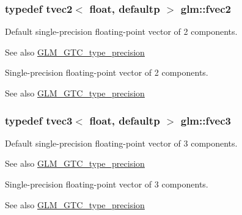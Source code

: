 \subsubsection[{fvec2}]{\setlength{\rightskip}{0pt plus 5cm}typedef tvec2$<$ float, defaultp $>$ {\bf glm\+::fvec2}}\label{group__gtc__type__precision_ga83fb34639f810d0c9240cf7ff0180e20}
Default single-\/precision floating-\/point vector of 2 components. \begin{DoxySeeAlso}{See also}
\hyperlink{group__gtc__type__precision}{G\+L\+M\+\_\+\+G\+T\+C\+\_\+type\+\_\+precision}
\end{DoxySeeAlso}
Single-\/precision floating-\/point vector of 2 components. \begin{DoxySeeAlso}{See also}
\hyperlink{group__gtc__type__precision}{G\+L\+M\+\_\+\+G\+T\+C\+\_\+type\+\_\+precision} 
\end{DoxySeeAlso}
\hypertarget{group__gtc__type__precision_ga8480fdaa7fb8e177e57b367be79863d8}{}
\subsubsection[{fvec3}]{\setlength{\rightskip}{0pt plus 5cm}typedef tvec3$<$ float, defaultp $>$ {\bf glm\+::fvec3}}\label{group__gtc__type__precision_ga8480fdaa7fb8e177e57b367be79863d8}
Default single-\/precision floating-\/point vector of 3 components. \begin{DoxySeeAlso}{See also}
\hyperlink{group__gtc__type__precision}{G\+L\+M\+\_\+\+G\+T\+C\+\_\+type\+\_\+precision}
\end{DoxySeeAlso}
Single-\/precision floating-\/point vector of 3 components. \begin{DoxySeeAlso}{See also}
\hyperlink{group__gtc__type__precision}{G\+L\+M\+\_\+\+G\+T\+C\+\_\+type\+\_\+precision} 
\end{DoxySeeAlso}
\hypertarget{group__gtc__type__precision_ga396c4084cd7e5465f8b56035e0420c3e}{}
